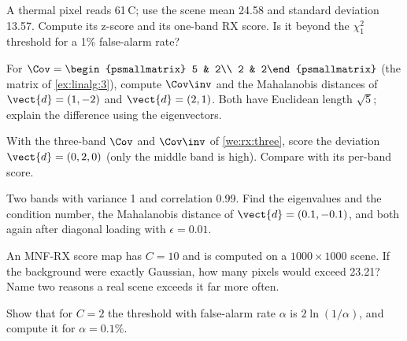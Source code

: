 \begin{checkyourself}
\item\label{ex:rx:1} A thermal pixel reads 61\,\textdegree C; use the scene mean 24.58 and standard
  deviation 13.57. Compute its z-score and its one-band RX score. Is it beyond the $\chi^2_1$ threshold
  for a 1\% false-alarm rate?
\item\label{ex:rx:2} For $\Cov = \begin{psmallmatrix} 5 & 2\\ 2 & 2\end{psmallmatrix}$ (the matrix of
  \cref{ex:linalg:3}), compute $\Cov\inv$ and the Mahalanobis distances of $\vect{d} = (1, -2)$ and
  $\vect{d} = (2, 1)$. Both have Euclidean length $\sqrt5$; explain the difference using the eigenvectors.
\item\label{ex:rx:3} With the three-band $\Cov$ and $\Cov\inv$ of \cref{we:rx:three}, score the deviation
  $\vect{d} = (0, 2, 0)$ (only the middle band is high). Compare with its per-band score.
\item\label{ex:rx:4} Two bands with variance 1 and correlation 0.99. Find the eigenvalues and the
  condition number, the Mahalanobis distance of $\vect{d} = (0.1, -0.1)$, and both again after diagonal
  loading with $\epsilon = 0.01$.
\item\label{ex:rx:5} An MNF-RX score map has $C = 10$ and is computed on a $1000\times1000$ scene. If the
  background were exactly Gaussian, how many pixels would exceed 23.21? Name two reasons a real scene
  exceeds it far more often.
\item\label{ex:rx:6} Show that for $C = 2$ the threshold with false-alarm rate $\alpha$ is $2\ln(1/\alpha)$,
  and compute it for $\alpha = 0.1\%$.
\end{checkyourself}

